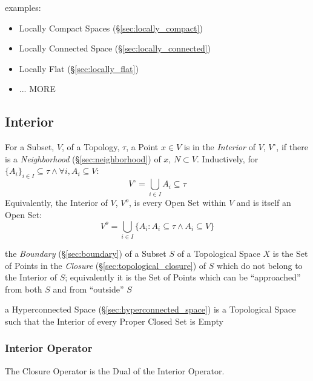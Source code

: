examples:
\begin{itemize}
  \item Locally Compact Spaces (\S\ref{sec:locally_compact})
  \item Locally Connected Space (\S\ref{sec:locally_connected})
  \item Locally Flat (\S\ref{sec:locally_flat})
  \item ... MORE
\end{itemize}



\subsection{Interior}\label{sec:interior}

For a Subset, $V$, of a Topology, $\tau$, a Point $x \in V$ is in the
\emph{Interior} of $V$, $V^{\circ}$, if there is a \emph{Neighborhood}
(\S\ref{sec:neighborhood}) of $x$, $N \subset V$. Inductively, for
$\{A_i\}_{i \in I} \subseteq \tau \wedge \forall i, A_i \subseteq V$:
\[
  V^{\circ} = \bigcup_{i \in I} A_i \subseteq \tau
\]
Equivalently, the Interior of $V$, $V^o$, is every Open Set within $V$
and is itself an Open Set:
\[
  V^o = \bigcup_{i \in I} \{ A_i : A_i \subseteq \tau \wedge A_i
  \subseteq V \}
\]

\fist the \emph{Boundary} (\S\ref{sec:boundary}) of a Subset $S$ of a
Topological Space $X$ is the Set of Points in the \emph{Closure}
(\S\ref{sec:topological_closure}) of $S$ which do not belong to the
Interior of $S$; equivalently it is the Set of Points which can be
``approached'' from both $S$ and from ``outside'' $S$

\fist a Hyperconnected Space (\S\ref{sec:hyperconnected_space}) is a
Topological Space such that the Interior of every Proper
Closed Set is Empty



\subsubsection{Interior Operator}\label{sec:interior_operator}

The Closure Operator is the Dual of the Interior Operator.



